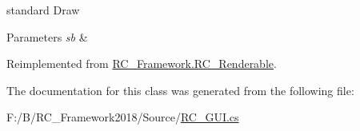 standard Draw 


\begin{DoxyParams}{Parameters}
{\em sb} & \\
\hline
\end{DoxyParams}


Reimplemented from \mbox{\hyperlink{class_r_c___framework_1_1_r_c___renderable_acc26db34e382a25a989c4c0dd0354b23}{R\+C\+\_\+\+Framework.\+R\+C\+\_\+\+Renderable}}.



The documentation for this class was generated from the following file\+:\begin{DoxyCompactItemize}
\item 
F\+:/\+B/\+R\+C\+\_\+\+Framework2018/\+Source/\mbox{\hyperlink{_r_c___g_u_i_8cs}{R\+C\+\_\+\+G\+U\+I.\+cs}}\end{DoxyCompactItemize}
